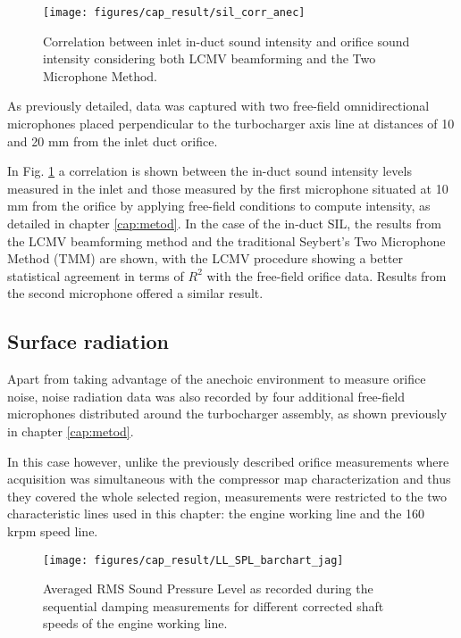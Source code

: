 \begin{figure}[b!]
\centering
\texttt{[image: figures/cap\_result/sil\_corr\_anec]}
\caption{Correlation between inlet in-duct sound intensity and orifice sound intensity considering both LCMV beamforming and the Two Microphone Method.}
\label{fig:sil_corr_aneic}
\end{figure}

As previously detailed, data was captured with two free-field omnidirectional microphones placed perpendicular to the turbocharger axis line at distances of 10 and 20 mm from the inlet duct orifice.

In Fig. \ref{fig:sil_corr_aneic} a correlation is shown between the  in-duct sound intensity levels measured in the inlet and those measured by the first microphone situated at 10 mm from the orifice by applying free-field conditions to compute intensity, as detailed in chapter \ref{cap:metod}. In the case of the in-duct SIL, the results from the LCMV beamforming method and the traditional Seybert's \cite{seybert1988two} Two Microphone Method (TMM) are shown, with the LCMV procedure showing a better statistical agreement in terms of $R^2$ with the free-field orifice data. Results from the second microphone offered a similar result.

\subsection{Surface radiation}

Apart from taking advantage of the anechoic environment to measure orifice noise, noise radiation data was also recorded by four additional free-field microphones distributed around the turbocharger assembly, as shown previously in chapter \ref{cap:metod}.

In this case however, unlike the previously described orifice measurements where acquisition was simultaneous with the compressor map characterization and thus they covered the whole selected region, measurements were restricted to the two characteristic lines used in this chapter: the engine working line and the 160 krpm speed line.

\begin{figure}[tbh!]
\centering
\texttt{[image: figures/cap\_result/LL\_SPL\_barchart\_jag]}
\caption{Averaged RMS Sound Pressure Level as recorded during the sequential damping measurements for different corrected shaft speeds of the engine working line.}
\label{fig:result_spl_radiated_comp_bar_LL}
\end{figure}


